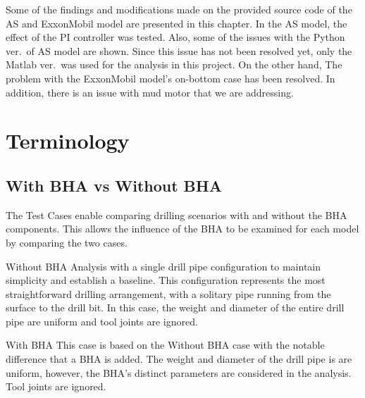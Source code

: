 Some of the findings and modifications made on the provided source code of the AS and ExxonMobil model are presented in this chapter. In the AS model, the effect of the PI controller was tested. Also, some of the issues with the Python ver.\ of AS model are shown. Since this issue has not been resolved yet, only the Matlab ver.\ was used for the analysis in this project. On the other hand, The problem with the ExxonMobil model's on-bottom case has been resolved. In addition, there is an issue with mud motor that we are addressing. 

\section{Terminology}
\subsection{With BHA vs Without BHA}
The Test Cases enable comparing drilling scenarios with and without the BHA components. This allows the influence of the BHA to be examined for each model by comparing the two cases.

\begin{definition}{Without BHA}
Analysis with a single drill pipe configuration to maintain simplicity and establish a baseline. This configuration represents the most straightforward drilling arrangement, with a solitary pipe running from the surface to the drill bit. In this case, the weight and diameter of the entire drill pipe are uniform and tool joints are ignored.
\end{definition}
\begin{definition}{With BHA}
This case is based on the Without BHA case with the notable difference that a BHA is added.  The weight and diameter of the drill pipe is are uniform, however, the BHA's distinct parameters are considered in the analysis.  Tool joints are ignored.
\end{definition}


